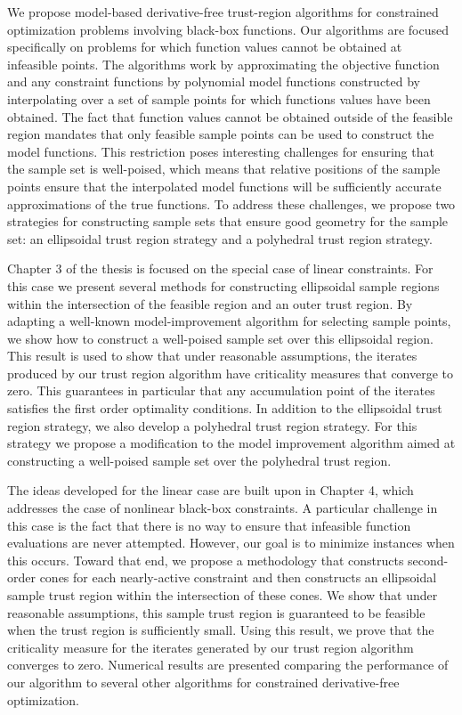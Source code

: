 
We propose model-based derivative-free trust-region algorithms for constrained optimization problems involving black-box functions.   Our algorithms are focused specifically on problems for which function values cannot be obtained at infeasible points.    The algorithms work by approximating the objective function and any constraint functions by polynomial model functions constructed by interpolating over a set of sample points for which functions values have been obtained.   The fact that function values cannot be obtained outside of the feasible region mandates that only feasible sample points can be used to construct the model functions.   This restriction poses interesting challenges for ensuring that the sample set is well-poised, which means that relative positions of the sample points ensure that the interpolated model functions will be sufficiently accurate approximations of the true functions.  To address these challenges, we propose two strategies for constructing sample sets that ensure good geometry for the sample set:  an ellipsoidal trust region strategy and a polyhedral trust region strategy.   

Chapter 3 of the thesis is focused on the special case of linear constraints.   For this case we present several methods for constructing ellipsoidal sample regions within the intersection of the feasible region and an outer trust region.    By adapting a well-known model-improvement algorithm for selecting sample points, we show how to construct a well-poised sample set over this ellipsoidal region.     This result is used to show that under reasonable assumptions,  the iterates produced by our trust region algorithm have criticality measures that converge to zero.   This guarantees in particular that any accumulation point of the iterates satisfies the first order optimality conditions.  In addition to the ellipsoidal trust region strategy, we also develop a polyhedral trust region strategy.  For this strategy we propose a modification to the model improvement algorithm aimed at constructing a well-poised sample set over the polyhedral trust region.

The ideas developed for the linear case are built upon in Chapter 4, which addresses the case of nonlinear black-box constraints.  A particular challenge in this case is the fact that there is no way to ensure that infeasible function evaluations are never attempted.   However, our goal is to minimize instances when this occurs.  Toward that end, we propose a methodology that constructs second-order cones for each nearly-active constraint and then constructs an ellipsoidal sample trust region within the intersection of these cones.  We show that under reasonable assumptions, this sample trust region is guaranteed to be feasible when the trust region is sufficiently small.  Using this result, we prove that the criticality measure for the iterates generated by our trust region algorithm converges to zero.   Numerical results are presented comparing the performance of our algorithm to several other algorithms for constrained derivative-free optimization.
 